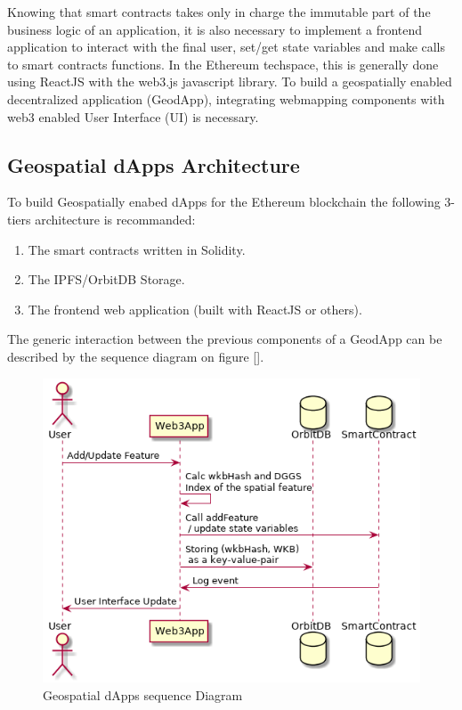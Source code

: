 \documentclass{isprs} %
\begin{document}
Knowing that smart contracts takes only in charge the immutable part of the business logic of an application, it is also necessary to implement a frontend application to interact with the final user, set/get state variables and make calls to smart contracts functions. In the Ethereum techspace, this is generally done using ReactJS with the web3.js javascript library. To build a geospatially enabled decentralized application (GeodApp), integrating webmapping components with web3 enabled User Interface (UI) is necessary.
 
\subsection{Geospatial dApps Architecture}\label{sec:Geospatial dApps Architecture}

To build Geospatially enabed dApps for the Ethereum blockchain the following 3-tiers architecture is recommanded:

\begin{enumerate}
\setlength\itemsep{0em}\setlength\parskip{0em}\setlength\topsep{0em}\setlength\partopsep{0em}\setlength\parsep{0em} 
\item{The smart contracts written in Solidity.} 
\item{The IPFS/OrbitDB Storage.}
\item{The frontend web application (built with ReactJS or others).}
\end{enumerate}

The generic interaction between the previous components of a GeodApp can be described by the sequence diagram on figure [].

\begin{figure}[ht!]
\begin{center}
		\includegraphics[width=1.0\columnwidth]{figures/seq-geospatial-dapps.png}
	\caption{Geospatial dApps sequence Diagram}
\label{fig:figure_geo_dapps_seq}
\end{center}
\end{figure}
\end{document}
